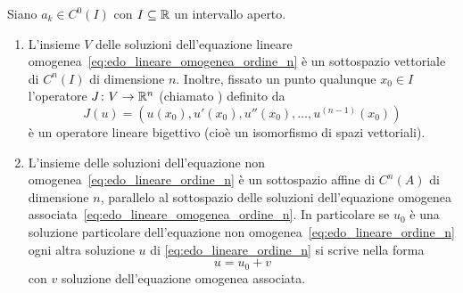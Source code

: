 \begin{theorem}
\label{th:edo_lineare_ordine_n}
\mymark{***}
Siano $a_k\in C^0(I)$ con $I\subseteq \mathbb R$
un intervallo aperto.

\begin{enumerate}
\item
L'insieme $V$ delle soluzioni dell'equazione lineare omogenea~\eqref{eq:edo_lineare_omogenea_ordine_n}
è un sottospazio vettoriale di $C^n(I)$ di dimensione $n$.
Inoltre, fissato un punto qualunque $x_0\in I$ l'operatore $J\colon V \to \mathbb R^n$
(chiamato ) definito da
\begin{equation}\label{eq:jet}
  J(u) = (u(x_0), u'(x_0), u''(x_0), \dots, u^{(n-1)}(x_0))
\end{equation}
è un operatore lineare bigettivo (cioè un isomorfismo di spazi vettoriali).

\item
L'insieme delle soluzioni dell'equazione non omogenea~\eqref{eq:edo_lineare_ordine_n}
è un sottospazio affine di $C^n(A)$ di dimensione $n$,
parallelo al sottospazio delle soluzioni dell'equazione omogenea
associata~\eqref{eq:edo_lineare_omogenea_ordine_n}.
In particolare se $u_0$ è una soluzione particolare dell'equazione non
omogenea~\eqref{eq:edo_lineare_ordine_n} ogni altra soluzione $u$ di
\eqref{eq:edo_lineare_ordine_n} si scrive nella forma
\[
  u = u_0 + v
\]
con $v$ soluzione dell'equazione omogenea associata.
\end{enumerate}
\end{theorem}
%
